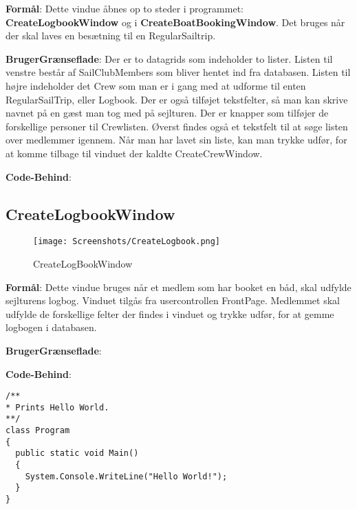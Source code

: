 \textbf{Formål}: Dette vindue åbnes op to steder i programmet: \textbf{CreateLogbookWindow} og i \textbf{CreateBoatBookingWindow}. Det bruges når der skal laves en besætning til en RegularSailtrip.  

\textbf{BrugerGrænseflade}: Der er to datagrids som indeholder to lister. Listen til venstre består af SailClubMembers som bliver hentet ind fra databasen. Listen til højre indeholder det Crew som man er i gang med at udforme til enten RegularSailTrip, eller Logbook. Der er også tilføjet tekstfelter, så man kan skrive navnet på en gæst man tog med på sejlturen. Der er knapper som tilføjer de forskellige personer til Crewlisten. Øverst findes også et tekstfelt til at søge listen over medlemmer igennem. Når man har lavet sin liste, kan man trykke udfør, for at komme tilbage til vinduet der kaldte CreateCrewWindow.

\textbf{Code-Behind}: 

\subsection{CreateLogbookWindow}

\begin{wrapfigure}{r}{0.5\textwidth}
    \label{img:login_interface}
    \vspace{-20pt}
    \begin{center}
        \texttt{[image: Screenshots/CreateLogbook.png]}
    \end{center}
    \vspace{-15pt}
    \caption{CreateLogBookWindow}
    \vspace{-30pt}
\end{wrapfigure}

\textbf{Formål}: Dette vindue bruges når et medlem som har booket en båd, skal udfylde sejlturens logbog. Vinduet tilgås fra usercontrollen FrontPage. Medlemmet skal udfylde de forskellige felter der findes i vinduet og trykke udfør, for at gemme logbogen i databasen.

\textbf{BrugerGrænseflade}: 

\textbf{Code-Behind}:


\begin{lstlisting}[frame=single, caption=Hej]
/**
* Prints Hello World.
**/
class Program
{
  public static void Main()
  {
    System.Console.WriteLine("Hello World!");
  }
}
\end{lstlisting}

